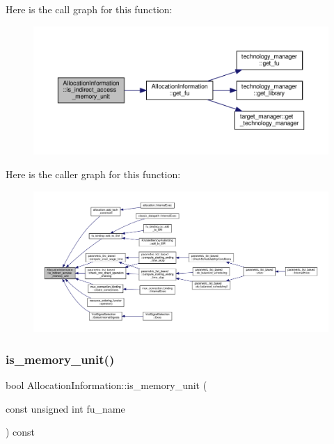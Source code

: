 Here is the call graph for this function\+:
\nopagebreak
\begin{figure}[H]
\begin{center}
\leavevmode
\includegraphics[width=350pt]{d7/d79/classAllocationInformation_a78857c97df2c595abff1d03c6a6c3a87_cgraph}
\end{center}
\end{figure}
Here is the caller graph for this function\+:
\nopagebreak
\begin{figure}[H]
\begin{center}
\leavevmode
\includegraphics[width=350pt]{d7/d79/classAllocationInformation_a78857c97df2c595abff1d03c6a6c3a87_icgraph}
\end{center}
\end{figure}
\mbox{\label{classAllocationInformation_aff3cc55dcb47a850812a142dc9b1b6b9}} 
\subsubsection{\texorpdfstring{is\+\_\+memory\+\_\+unit()}{is\_memory\_unit()}}
{\footnotesize\ttfamily bool Allocation\+Information\+::is\+\_\+memory\+\_\+unit (\begin{DoxyParamCaption}\item[{const unsigned int}]{fu\+\_\+name }\end{DoxyParamCaption}) const}



